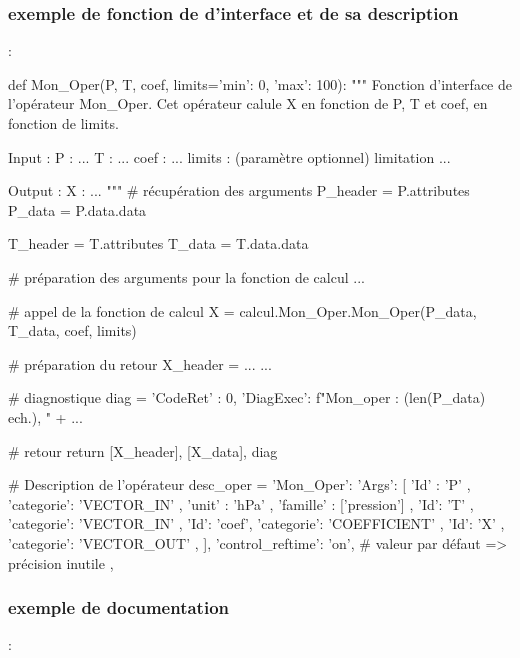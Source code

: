\subsubsection{exemple de fonction de d'interface et de sa description}
\label{sec:ex_fct_interface}
 :

  \begin{boxedverbatim}
  def Mon_Oper(P, T, coef, limits={'min': 0, 'max': 100}):
      """ Fonction d'interface de l'opérateur Mon_Oper.
          Cet opérateur calule X en fonction de P, T et coef, en fonction de limits.

          Input :
              P    : ...
              T    : ...
              coef : ...
              limits : (paramètre optionnel) limitation ...

        Output :
              X    : ...
      """
      # récupération des arguments
      P_header = P.attributes
      P_data   = P.data.data

      T_header = T.attributes
      T_data   = T.data.data

      # préparation des arguments pour la fonction de calcul
      ...

      # appel de la fonction de calcul
      X = calcul.Mon_Oper.Mon_Oper(P_data, T_data, coef, limits)

      # préparation du retour
      X_header = ...
      ...

      # diagnostique
      diag = {'CodeRet' : 0,
              'DiagExec': f"Mon_oper : ({len(P_data)} ech.), " + ...
             }

      # retour
      return [X_header], [X_data], diag

  # Description de l'opérateur
  desc_oper = {
    'Mon_Oper': {
      'Args': [
        {'Id'       : 'P'         ,
         'categorie': 'VECTOR_IN' ,
         'unit'     : 'hPa'       ,
         'famille'  : ['pression']
        },
        {'Id': 'T'   , 'categorie': 'VECTOR_IN'                  },
        {'Id': 'coef', 'categorie': 'COEFFICIENT'                },
        {'Id': 'X'   , 'categorie': 'VECTOR_OUT'                 },
      ],
      'control_reftime': 'on', # valeur par défaut => précision inutile
    },
  }
  \end{boxedverbatim}

\subsubsection{exemple de documentation}
\label{sec:ex_doc_oper}
 :

